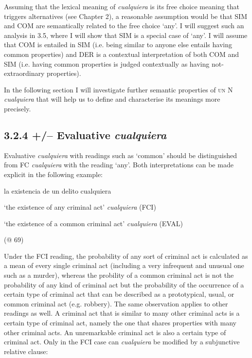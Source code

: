   Assuming that the lexical meaning of \textit{cualquiera} is its free choice meaning that triggers alternatives (see Chapter 2), a reasonable assumption would be that SIM and COM are semantically related to the free choice ‘any’. I will suggest such an analysis in 3.5, where I will show that SIM is a special case of ‘any’. I will assume that COM is entailed in SIM (i.e. being similar to anyone else entails having common properties) and DER is a contextual interpretation of both COM and SIM (i.e. having common properties is judged contextually as having not-extraordinary properties).

  In the following section I will investigate further semantic properties of \textsc{un} N \textit{cualquiera} that will help us to define and characterise its meanings more precisely. 

\subsection{\textbf{3.2.4} \textbf{+/–} \textbf{Evaluative} \textbf{\textit{cualquiera}}}

Evaluative \textit{cualquiera} with readings such as ‘common’ should be distinguished from FC \textit{cualquiera} with the reading ‘any’. Both interpretations can be made explicit in the following example:

  la existencia de un delito cualquiera

  ‘the existence of any criminal act’                                     \textit{cualquiera} (FCI)

  ‘the existence of a common criminal act’                                    \textit{cualquiera} (EVAL)

  (@ 69)

Under the FCI reading, the probability of any sort of criminal act is calculated as a mean of every single criminal act (including a very infrequent and unusual one such as a murder), whereas the probility of a common criminal act is not the probability of any kind of criminal act but the probability of the occurrence of a certain type of criminal act that can be described as a prototypical, usual, or common criminal act (e.g. robbery). The same observation applies to other readings as well. A criminal act that is similar to many other criminal acts is a certain type of criminal act, namely the one that shares properties with many other criminal acts. An unremarkable criminal act is also a certain type of criminal act. Only in the FCI case can \textit{cualquiera} be modified by a subjunctive relative clause:

